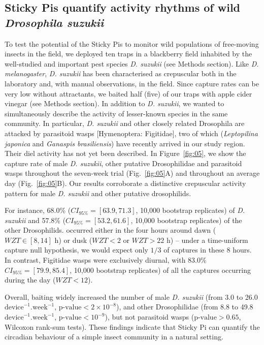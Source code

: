 \documentclass[12pt]{article}
\begin{document}
\begin{linenumbers}
		\subsection*{Sticky Pis quantify activity rhythms of wild \emph{Drosophila suzukii}}
		
		To test the potential of the Sticky Pis to monitor wild populations of free-moving insects in the field, we deployed ten traps in a blackberry field inhabited by the well-studied and important pest species \emph{D. suzukii} (see Methods section). Like \emph{D. melanogaster}, \emph{D. suzukii} has been characterised as crepuscular both in the laboratory\cite{shaw_control_2019} and, with manual observations, in the field\cite{swoboda-bhattarai_diurnal_2020}. Since capture rates can be very low without attractants\cite{swoboda-bhattarai_diurnal_2020}, we baited half (five) of our traps with apple cider vinegar (see Methods section). In addition to \emph{D. suzukii}, we wanted to simultaneously describe the activity of lesser-known species in the same community. In particular, \emph{D. suzukii} and other closely related Drosophila are attacked by parasitoid wasps [Hymenoptera: Figitidae], two of which (\emph{Leptopilina japonica} and \emph{Ganaspis brasiliensis}) have recently arrived in our study region\cite{abram_new_2020}. Their diel activity has not yet been described. In Figure~\ref{fig:05}, we show the capture rate of male \emph{D. suzukii}, other putative Drosophilidae and parasitoid wasps throughout the seven-week trial (Fig.~\ref{fig:05}A) and throughout an average day (Fig.~\ref{fig:05}B). Our results corroborate a distinctive crepuscular activity pattern for male \emph{D. suzukii} and other putative drosophilids.

		
		For instance, 68.0\% ($CI_{95\%} =  [63.9, 71.3]$, 10,000 bootstrap replicates) of \emph{D. suzukii} and 
		57.8\% ($CI_{95\%} =  [53.2, 61.6]$, 10,000 bootstrap replicates) of the other Drosophilids.
		 occurred either in the four hours around dawn ($WZT \in [8, 14]$ h) or dusk ($WZT < 2$ or $WZT > 22$ h) -- under a time-uniform capture null hypothesis, we would expect only $1/3$ of captures in these 8 hours.
		In contrast, Figitidae wasps were exclusively diurnal, with 83.0\% $CI_{95\%} =  [79.9, 85.4]$, 10,000 bootstrap replicates) of all the captures occurring during the day ($WZT < 12$).		
		
		Overall, baiting widely increased the number of male \emph{D. suzukii} (from 3.0 to 26.0 $\text{device}^{-1}.\text{week}^{-1}$, $\text{p-value} < 2\times{}10^{-8}$), and other Drosophilidae (from 8.8 to 49.8 $\text{device}^{-1}.\text{week}^{-1}$, $\text{p-value} < 10^{-9}$), but not parasitoid wasps ($\text{p-value} > 0.65$, Wilcoxon rank-sum tests).
		These findings indicate that Sticky Pi can quantify the circadian behaviour of a simple insect community in a natural setting.
		

\end{linenumbers}
\end{document}
